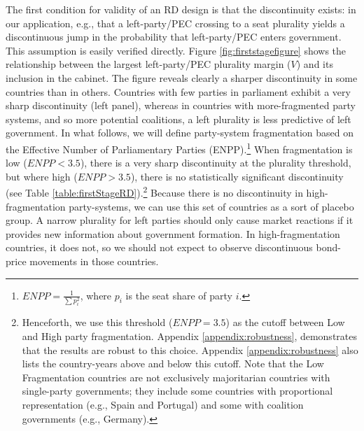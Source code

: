 \documentclass[12pt]{article}
\begin{document}
The first condition for validity of an RD design is that the discontinuity exists: in our application, e.g., that a left-party/PEC crossing to a seat plurality yields a discontinuous jump in the probability that left-party/PEC enters government. This assumption is easily verified directly. Figure \ref{fig:firststagefigure} shows the relationship between the largest left-party/PEC plurality margin ($V$) and its inclusion in the cabinet. The figure reveals clearly a sharper discontinuity in some countries than in others. Countries with few parties in parliament exhibit a very sharp discontinuity (left panel), whereas in countries with more-fragmented party systems, and so more potential coalitions, a left plurality is less predictive of left government. In what follows, we will define party-system fragmentation based on the Effective Number of Parliamentary Parties (ENPP).\footnote{$ENPP = \frac{1}{\sum p_i^2}$, where $p_i$ is the seat share of party $i$.} When fragmentation is low ($ENPP < 3.5$), there is a very sharp discontinuity at the plurality threshold, but where high ($ENPP > 3.5$), there is no statistically significant discontinuity (see Table \ref{table:firstStageRD}).\footnote{Henceforth, we use this threshold ($ENPP = 3.5$) as the cutoff between Low and High party fragmentation. Appendix \ref{appendix:robustness}, demonstrates that the results are robust to this choice. Appendix \ref{appendix:robustness} also lists the country-years above and below this cutoff. Note that the Low Fragmentation countries are not exclusively majoritarian countries with single-party governments; they include some countries with proportional representation (e.g., Spain and Portugal) and some with coalition governments (e.g., Germany).} Because there is no discontinuity in high-fragmentation party-systems, we can use this set of countries as a sort of placebo group. A narrow plurality for left parties should only cause market reactions if it provides new information about government formation. In high-fragmentation countries, it does not, so we should not expect to observe discontinuous bond-price movements in those countries. 
\end{document}
